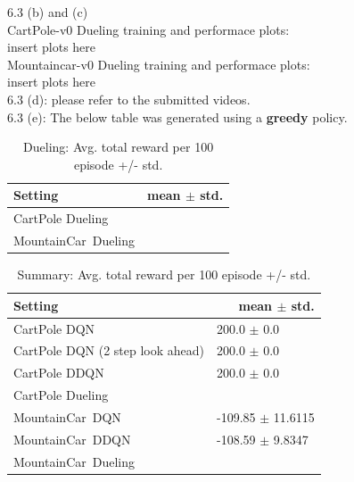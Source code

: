 \documentclass[12pt]{article}
\begin{document}
    \begin{tcolorbox}[fit,height=22cm, width=\textwidth, blank, borderline={1pt}{-2pt},nobeforeafter]
    {\large 6.3  (b) and (c)} \\
    {\large CartPole-v0 Dueling training and performace plots:} \\
    insert plots here\\
    {\large Mountaincar-v0 Dueling training and performace plots:} \\
    insert plots here\\
    {\large 6.3 (d):} please refer to the submitted videos. \\
    {\large 6.3 (e):} The below table was generated using a \textbf{greedy} policy.
        \begin{table}[H]
    	\centering
    	\caption{ Dueling:  Avg. total reward per 100 episode +/- std.}
    	\begin{tabular}{|p{9.43em}|r|}
    		\hline
    		\textbf{\small Setting} & \multicolumn{1}{p{10.645em}|}{\textbf{ \small mean $\pm$ std.}} \\
    		\hline
    		{\small CartPole Dueling} &  \\
    		\hline
    		{\small MountainCar Dueling} &  \\
    		\hline
    	\end{tabular}%
    	\label{tab4}%
    \end{table}%
    \end{tcolorbox}
    \begin{tcolorbox}[fit,height=22cm, width=\textwidth, blank, borderline={1pt}{-2pt},nobeforeafter]
        \begin{table}[H]
    	\centering
    	\caption{ Summary: Avg. total reward per 100 episode +/- std.}
    	\begin{tabular}{|p{9.43em}|r|}
    		\hline
    		\textbf{\small Setting} & \multicolumn{1}{p{10.645em}|}{\textbf{ \small mean $\pm$ std.}} \\
    		\hline
    		{\small CartPole DQN} & \multicolumn{1}{l|}{200.0 $\pm$ 0.0} \\
    		\hline
    		{\small CartPole DQN} \newline{} {\small(2 step look ahead)} & \multicolumn{1}{l|}{200.0 $\pm$ 0.0} \\
    		\hline
    		{\small CartPole DDQN} & \multicolumn{1}{l|}{200.0 $\pm$ 0.0} \\
    		\hline
    		{\small CartPole Dueling} &  \\
    		\hline
    		{\small MountainCar DQN} & \multicolumn{1}{l|}{-109.85 $\pm$ 11.6115} \\
    		\hline
    		{\small MountainCar DDQN} & \multicolumn{1}{l|}{-108.59 $\pm$ 9.8347} \\
    		\hline
    		{\small MountainCar Dueling} &  \\
    		\hline
    	\end{tabular}%
    	\label{tab5}%
    \end{table}%
    \end{tcolorbox}
\end{document}
